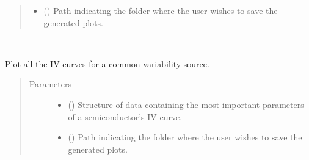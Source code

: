 \documentclass[letterpaper,10pt,english,openany, oneside]{sphinxmanual}
\begin{document}
\begin{fulllineitems}
\begin{fulllineitems}
\begin{quote}
\begin{description}
\begin{itemize}
\item {} 
 (\sphinxstyleliteralemphasis{\sphinxupquote{, }}) \textendash{} Path indicating the folder where the user wishes to save the generated plots.

\end{itemize}

\end{description}\end{quote}

\end{fulllineitems}


\begin{fulllineitems}
\label{\detokenize{index:fompy.plots.plotter.varplot}}~

\begin{fulllineitems}
Plot all the IV curves for a common variability source.

\end{fulllineitems}

\begin{quote}\begin{description}
\item[{Parameters}] \leavevmode\begin{itemize}
\item {} 
 () \textendash{} Structure of data containing the most important parameters of a semiconductor’s IV curve.

\item {} 
 (\sphinxstyleliteralemphasis{\sphinxupquote{, }}) \textendash{} Path indicating the folder where the user wishes to save the generated plots.

\end{itemize}

\end{description}\end{quote}

\end{fulllineitems}


\end{fulllineitems}
\end{document}
